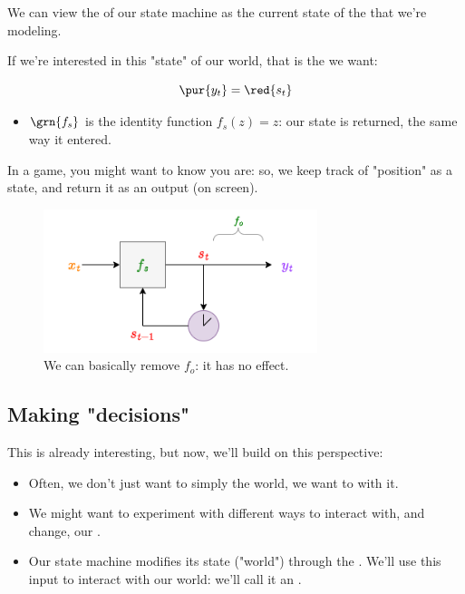        \begin{concept}
            We can view the  of our state machine as the current state of the  that we're modeling.

            If we're interested in this "state" of our world, that is the  we want:

            \begin{equation*}
                \pur{y_t} = \red{s_t}
            \end{equation*}

            \begin{itemize}
                \item $\grn{f_s}$ is the identity function $f_s(z)=z$: our state is returned, the same way it entered.
            \end{itemize}
            
        \end{concept}

        \miniex In a game, you might want to know  you are: so, we keep track of "position" as a state, and return it as an output (on screen).

        \begin{figure}[H]
            \centering
            \includegraphics[width=80mm,scale=0.5]{images/mdp_images/state_machine_outputstate.png}
            
            \caption*{We can basically remove $f_o$: it has no effect.}
        \end{figure}



    \phantom{}

    \subsection{Making "decisions"}

        This is already interesting, but now, we'll build on this perspective:

        \begin{itemize}
            \item Often, we don't just want to simply  the world, we want to  with it.
            \item We might want to experiment with different ways to interact with, and change, our .
            \item Our state machine modifies its state ("world") through the . We'll use this input to interact with our world: we'll call it an .\\
        \end{itemize}

